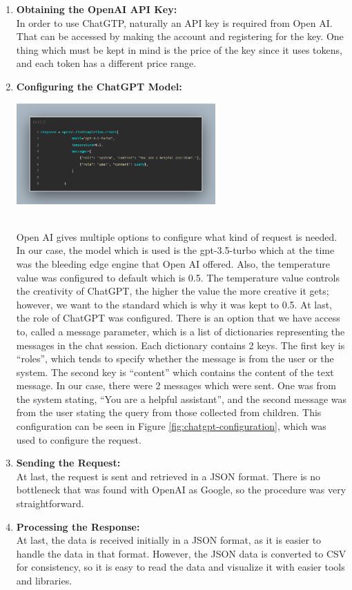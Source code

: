 \documentclass[50pt]{usiinfbachelorproject}
\begin{document}
\begin{enumerate}
  \item \textbf{Obtaining the OpenAI API Key:} \\
  In order to use ChatGTP, naturally an API key is required from Open AI. That can be accessed by making the account and registering for the key. One thing which must be kept in mind is the price of the key since it uses tokens, and each token has a different price range.
  \item \textbf{Configuring the ChatGPT Model:} \\
  \noindent
  \begin{minipage}{\linewidth}
  \centering
  \includegraphics[width=0.6\textwidth]{images/chatgpt-configuration.png}
  \label{fig:chatgpt-configuration}
  \end{minipage}
  \\
  Open AI gives multiple options to configure what kind of request is needed. In our case, the model which is used is the gpt-3.5-turbo which at the time was the bleeding edge engine that Open AI offered. Also, the temperature value was configured to default which is 0.5. The temperature value controls the creativity of ChatGPT, the higher the value the more creative it gets; however, we want to the standard which is why it was kept to 0.5. At last, the role of ChatGPT was configured. There is an option that we have access to, called a message parameter, which is a list of dictionaries representing the messages in the chat session. Each dictionary contains 2 keys. The first key is “roles”, which tends to specify whether the message is from the user or the system. The second key is “content” which contains the content of the text message. In our case, there were 2 messages which were sent. One was from the system stating, “You are a helpful assistant”, and the second message was from the user stating the query from those collected from children. This configuration can be seen in Figure \ref{fig:chatgpt-configuration}, which was used to configure the request.
  \item \textbf{Sending the Request:} \\
  At last, the request is sent and retrieved in a JSON format. There is no bottleneck that was found with OpenAI as Google, so the procedure was very straightforward.
  \item \textbf{Processing the Response:} \\
  At last, the data is received initially in a JSON format, as it is easier to handle the data in that format. However, the JSON data is converted to CSV for consistency, so it is easy to read the data and visualize it with easier tools and libraries.
\end{enumerate}
\end{document}
